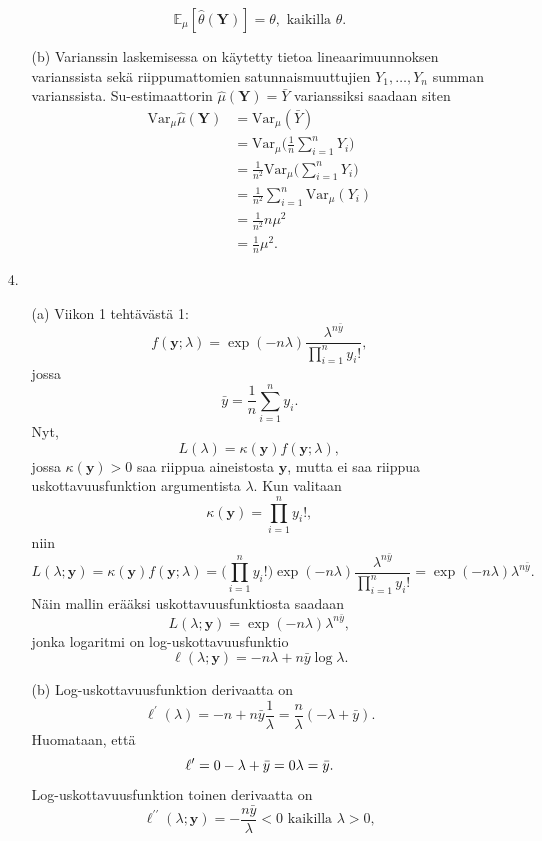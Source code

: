 \documentclass[12pt]{article}
\begin{document}
\begin{enumerate}
\begin{enumerate}
$$
\mathbb{E}_\mu[\hat{\theta}(\textbf{Y})] = \theta, \text{ kaikilla } \theta.
$$
\item[(b)] Varianssin laskemisessa on käytetty tietoa lineaarimuunnoksen varianssista sekä riippumattomien satunnaismuuttujien $Y_1, \ldots, Y_n$ summan varianssista. Su-estimaattorin $\hat{\mu}(\textbf{Y}) = \bar{Y}$ varianssiksi saadaan siten
$$
\begin{aligned}
\text{Var}_\mu\hat{\mu}(\textbf{Y}) &= \text{Var}_\mu(\bar{Y}) \\
    &= \text{Var}_\mu \Bigg( \frac{1}{n} \sum_{i = 1}^n Y_i \Bigg) \\
    &= \frac{1}{n^2} \text{Var}_\mu\Bigg( \sum_{i=1}^n Y_i \Bigg) \\
    &= \frac{1}{n^2} \sum_{i = 1}^n \text{Var}_\mu(Y_i) \\
    &= \frac{1}{n^2}n\mu^2 \\
    &= \frac{1}{n} \mu^2. 
\end{aligned}
$$
\end{enumerate}
\item[4.] 
\begin{enumerate}
\item[(a)] Viikon 1 tehtävästä 1:
$$
f(\textbf{y}; \lambda) = \exp(-n\lambda) \frac{\lambda^{n\bar{y}}}{\prod_{i = 1}^n y_i!},
$$
jossa 
$$
\bar{y} = \frac{1}{n	} \sum_{i = 1}^n y_i.
$$
Nyt, 
$$
L(\lambda) = \kappa(\textbf{y}) f(\textbf{y}; \lambda),
$$
jossa $\kappa(\textbf{y}) > 0$ saa riippua aineistosta $\textbf{y}$, mutta ei saa riippua uskottavuusfunktion argumentista $\lambda$. Kun valitaan $$
\kappa(\textbf{y}) = \prod_{i = 1}^n y_i!,
$$
niin
$$
L(\lambda; \textbf{y}) = \kappa(\textbf{y})f(\textbf{y}; \lambda) = \Bigg( \prod_{i=1}^n y_i! \Bigg) \exp(-n\lambda) \frac{\lambda^{n\bar{y}}}{\prod_{i=1}^n y_i!} = \exp(-n\lambda) \lambda^{n\bar{y}}.
$$
Näin mallin erääksi uskottavuusfunktiosta saadaan
$$
L(\lambda; \textbf{y}) = \exp(-n\lambda) \lambda^{n\bar{y}},
$$
jonka logaritmi on log-uskottavuusfunktio
$$
\ell(\lambda; \textbf{y}) = -n\lambda + n\bar{y} \log \lambda.
$$
\item[(b)] Log-uskottavuusfunktion derivaatta on
$$
\ell^\prime(\lambda) = -n + n\bar{y}\frac{1}{\lambda} = \frac{n}{\lambda} (-\lambda + \bar{y}).
$$
Huomataan, että
$$
\ell^\prime = 0 \\
-\lambda + \bar{y} = 0 \\
\lambda = \bar{y}.
$$
Log-uskottavuusfunktion toinen derivaatta on
$$
\ell^{\prime \prime}(\lambda; \textbf{y}) = -\frac{n\bar{y}}{\lambda} < 0 \text{ kaikilla } \lambda > 0,
$$
\end{enumerate}
\end{enumerate}
\end{document}
